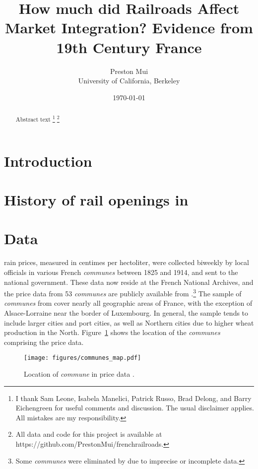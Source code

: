 \documentclass[12pt,twoside]{article}
\title{How much did Railroads Affect Market Integration? Evidence from 19th Century France}
\date{\today}
\author{Preston Mui \\ University of California, Berkeley}
\begin{document}
\maketitle

\begin{abstract}
   Abstract text
   \footnote{I thank Sam Leone, Isabela Manelici, Patrick Russo, Brad Delong, and Barry Eichengreen for useful comments and discussion. The usual disclaimer applies. All mistakes are my responsibility.}
   \footnote{All data and code for this project is available at https://github.com/PrestonMui/frenchrailroads.}
\end{abstract}

\newpage
\section{Introduction}


\section{History of rail openings in }

\section{Data}

rain prices, measured in centimes per hectoliter, were collected biweekly by local officials in various French \emph{communes} between 1825 and 1914, and sent to the national government.
These data now reside at the French National Archives, and the price data from 53 \emph{communes} are publicly available from \cite{prices}.\footnote{Some \emph{communes} were eliminated by \cite{prices} due to imprecise or incomplete data.}
The sample of \emph{communes} from \cite{prices} cover nearly all geographic areas of France, with the exception of Alsace-Lorraine near the border of Luxembourg.
In general, the sample tends to include larger cities and port cities, as well as Northern cities due to higher wheat production in the North.
Figure~\ref{fig:communes_map} shows the location of the \emph{communes} comprising the price data.

\begin{figure}[h]
	\centering
	\caption{Location of \emph{commune} in price data \citep{prices}.}
	\texttt{[image: figures/communes\_map.pdf]}
	\label{fig:communes_map}
\end{figure}

\end{document}
